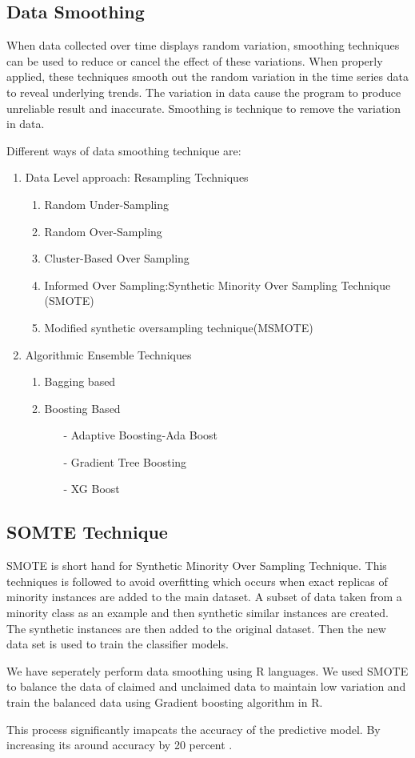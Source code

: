 \subsection{Data Smoothing}
When data collected over time displays random variation, smoothing techniques can be used to reduce or cancel the effect of these variations. When properly applied, these techniques smooth out the random variation in the time series data to reveal underlying trends. The variation  in data cause the program to  produce unreliable result and inaccurate. Smoothing is technique to remove the variation in data. 
\par
Different ways of data smoothing technique are:
\begin{enumerate}
\item Data Level approach: Resampling Techniques
	\begin{enumerate}
	\item Random Under-Sampling
	\item Random Over-Sampling
	\item Cluster-Based Over Sampling
	\item Informed Over Sampling:Synthetic Minority Over Sampling Technique (SMOTE)
	\item Modified synthetic oversampling technique(MSMOTE)
	\end{enumerate}

\item Algorithmic Ensemble Techniques
	\begin{enumerate}
	\item Bagging based
	\item Boosting Based
		\begin{itemize}
		\item[-] Adaptive Boosting-Ada Boost
		\item[-] Gradient Tree Boosting
		\item[-] XG Boost
		\end{itemize}
	\end{enumerate}

\end{enumerate}
\subsection{SOMTE Technique}
SMOTE is short hand for Synthetic Minority Over Sampling Technique. This techniques is followed to avoid overfitting which occurs when exact replicas of minority instances are added to the main dataset. A subset of data taken from a minority class as an example and then synthetic similar instances are created. The synthetic instances are then added to the original dataset. Then the new data set is used to train the classifier models.
\par 
We have seperately perform data smoothing using R languages. We used SMOTE to balance the data of claimed and unclaimed data to maintain low variation and train the balanced data using Gradient boosting algorithm in R. 
\par 
This process significantly imapcats the accuracy of the predictive model.  By increasing its around accuracy by 20 percent .

